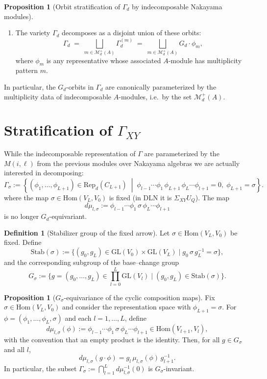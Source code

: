 \documentclass{article}
\theoremstyle{definition}
\newtheorem{proposition}[theorem]{Proposition}
\newtheorem{definition}[theorem]{Definition}
\begin{document}
\begin{proposition}[Orbit stratification of $\Gamma_d$ by indecomposable Nakayama modules]
\begin{enumerate}
Then $\Gamma_d^{(m)}$ is a single $G_d$-orbit.

\item
The variety $\Gamma_d$ decomposes as a disjoint union of these orbits:
\[
\Gamma_d
\;=\;
\bigsqcup_{m \in \mathcal M_d^+(A)} \Gamma_d^{(m)}
\;=\;
\bigsqcup_{m \in \mathcal M_d^+(A)} G_d \cdot \phi_m,
\]
where $\phi_m$ is any representative whose associated $A$-module has multiplicity pattern $m$.
\end{enumerate}

\noindent
In particular, the $G_d$-orbits in $\Gamma_d$ are canonically parameterized by the
multiplicity data of indecomposable $A$-modules, i.e.\ by the set
$\mathcal M_d^+(A)$.
\end{proposition}



\section{Stratification of $\Gamma_{XY}$}
While the indecomposable representation of $\Gamma$ are parameterized by the $M(i,\ell)$ from the previous modules over Nakayama algebras we are actually interested in decomposing:
\begin{equation*}
    \Gamma_{\sigma} := \left\{(\phi_1,\ldots,\phi_{L+1})\in \mathrm{Rep}_d(C_{L+1})\;\middle|\; \phi_{l-1}\cdots\phi_1\,\phi_{L+1}\,\phi_L\cdots\phi_{l+1} = 0,\; \phi_{L+1}=\sigma\right\}.
\end{equation*}
where the map $\sigma\in \mathrm{Hom}(V_L,V_0)$ is fixed (in DLN it is $\Sigma_{XY}U_Q$).
The map
\begin{equation*}
    d\mu_{l,\sigma} := \phi_{l-1}\cdots\phi_1\,\sigma\,\phi_L\cdots\phi_{l+1}
\end{equation*}
is no longer $G_d$-equivariant.

\begin{definition}[Stabilizer group of the fixed arrow]\label{def:stabilizer-sigma}
Let $\sigma\in\mathrm{Hom}(V_L,V_0)$ be fixed. Define
\[
\mathrm{Stab}(\sigma):=\{(g_0,g_L)\in \mathrm{GL}(V_0)\times \mathrm{GL}(V_L)\mid g_0\,\sigma\,g_L^{-1}=\sigma\},
\]
and the corresponding subgroup of the base--change group
\[
G_\sigma:=\{g=(g_0,\ldots,g_L)\in \prod_{l=0}^L\mathrm{GL}(V_l)\mid (g_0,g_L)\in \mathrm{Stab}(\sigma)\}.
\]
\end{definition}

\begin{proposition}[$G_\sigma$-equivariance of the cyclic composition maps]\label{prop:mu-sigma-equivariant}
Fix $\sigma\in\mathrm{Hom}(V_L,V_0)$ and consider the representation space with $\phi_{L+1}=\sigma$.
For $\phi=(\phi_1,\ldots,\phi_L,\sigma)$ and each $l=1,\ldots,L$, define
\[
d\mu_{l,\sigma}(\phi):=\phi_{l-1}\cdots \phi_1\,\sigma\,\phi_L\cdots \phi_{l+1}\in\mathrm{Hom}(V_{l+1},V_l),
\]
with the convention that an empty product is the identity.
Then, for all $g\in G_\sigma$ and all $l$,
\[
d\mu_{l,\sigma}(g\cdot \phi)= g_l\,\mu_{l,\sigma}(\phi)\,g_{l+1}^{-1}.
\]
In particular, the subset $\Gamma_\sigma:=\bigcap_{l=1}^L d\mu_{l,\sigma}^{-1}(0)$ is $G_\sigma$-invariant.
\end{proposition}
\end{document}
